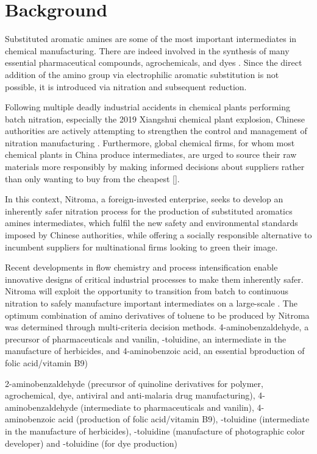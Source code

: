 \section{Background}

Substituted aromatic amines are some of the most important intermediates in chemical manufacturing. There are indeed involved in the synthesis of many essential pharmaceutical compounds, agrochemicals, and dyes \cite{vogt_amines_2000}. Since the direct addition of the amino group via electrophilic aromatic substitution is not possible, it is introduced via nitration and subsequent reduction. 

Following multiple deadly industrial accidents in chemical plants performing batch nitration, especially the 2019 Xiangshui chemical plant explosion, Chinese authorities are actively attempting to strengthen the control and management of nitration manufacturing \cite{el_diario_china_2019}. Furthermore, global chemical firms, for whom most chemical plants in China produce intermediates, are urged to source their raw materials more responsibly by making informed decisions about suppliers rather than only wanting to buy from the cheapest [].

In this context, Nitroma, a foreign-invested enterprise, seeks to develop an inherently safer nitration process for the production of substituted aromatics amines intermediates, which fulfil the new safety and environmental standards imposed by Chinese authorities, while offering a socially responsible alternative to incumbent suppliers for multinational firms looking to green their image. 

Recent developments in flow chemistry and process intensification enable innovative designs of critical industrial processes to make them inherently safer. Nitroma will exploit the opportunity to transition  from batch to continuous nitration to safely manufacture important intermediates on a large-scale \cite{di_miceli_raimondi_safety_2015}. The optimum combination of amino derivatives of toluene to be produced by Nitroma was determined through multi-criteria decision methods. 4-aminobenzaldehyde, a precursor of pharmaceuticals and vanilin, \ortho-toluidine, an intermediate in the manufacture of herbicides, and 4-aminobenzoic acid, an essential bproduction of folic acid/vitamin B9)






2-aminobenzaldehyde (precursor of quinoline derivatives for polymer, agrochemical, dye, antiviral and anti-malaria drug manufacturing), 4-aminobenzaldehyde (intermediate to pharmaceuticals and vanilin), 4-aminobenzoic acid (production of folic acid/vitamin B9), \ortho-toluidine (intermediate in the manufacture of herbicides), \meta-toluidine (manufacture of  photographic color developer) and \para-toluidine (for dye production) \cite{bowers_toluidines_2000,bruhne_benzaldehyde_2011,maki_benzoic_2000}

